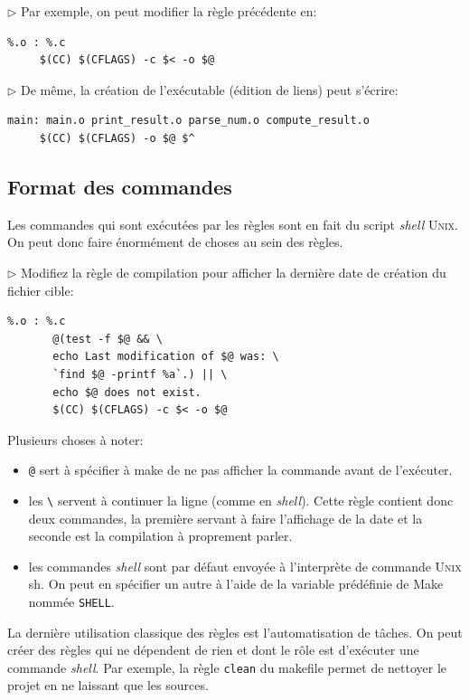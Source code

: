 \documentclass[11pt,a4paper]{article}
\newcommand{\must}{\noindent $\triangleright$ \xspace}
\newcommand{\bitem}{\item[$\bullet$]}
\begin{document}
\medskip

\must Par exemple, on peut modifier la règle précédente en:
{\small
\begin{verbatim}
%.o : %.c
     $(CC) $(CFLAGS) -c $< -o $@
\end{verbatim}
}

\must De même, la création de l'exécutable (édition de liens) peut
s'écrire:
{\small
\begin{verbatim}
main: main.o print_result.o parse_num.o compute_result.o
     $(CC) $(CFLAGS) -o $@ $^
\end{verbatim}
}

\subsection{Format des commandes}

Les commandes qui sont exécutées par les règles sont en fait du script
\emph{shell} \textsc{Unix}. On peut donc faire énormément de choses au
sein des règles.

\medskip

\must Modifiez la règle de compilation pour afficher la dernière date
de création du fichier cible:
{\small
\begin{verbatim}
%.o : %.c
       @(test -f $@ && \
       echo Last modification of $@ was: \
       `find $@ -printf %a`.) || \
       echo $@ does not exist.
       $(CC) $(CFLAGS) -c $< -o $@
\end{verbatim}
}

Plusieurs choses à noter:

\begin{itemize}

  \bitem \verb!@! sert à spécifier à make de ne pas afficher la
  commande avant de l'exécuter.

  \bitem les \verb!\! servent à continuer la ligne (comme en
  \emph{shell}). Cette règle contient donc deux commandes, la première
  servant à faire l'affichage de la date et la seconde est la
  compilation à proprement parler.

  \bitem les commandes \emph{shell} sont par défaut envoyée à
  l'interprète de commande \textsc{Unix} \textsf{sh}. On peut en spécifier un
  autre à l'aide de la variable prédéfinie de \textsf{Make} nommée
  \texttt{SHELL}.

\end{itemize}

La dernière utilisation classique des règles est l'automatisation de
tâches. On peut créer des règles qui ne dépendent de rien et dont le
rôle est d'exécuter une commande \emph{shell}. Par exemple, la règle
\texttt{clean} du makefile permet de nettoyer le projet en ne
laissant que les sources.
\end{document}
